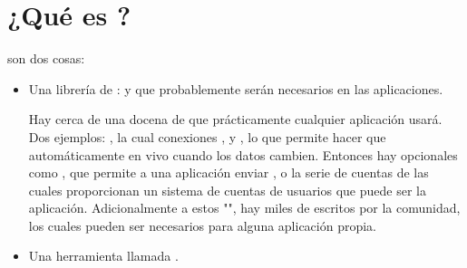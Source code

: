 \section{¿Qué es \meteor?}

\meteor son dos cosas:
\begin{itemize}
	\item  Una librería de \packages: \modules \prewritten y \selfcontained que probablemente serán necesarios en las aplicaciones.

Hay cerca de una docena de \packages \coreAS \meteor que prácticamente cualquier aplicación usará.  Dos ejemplos: \webapp, la cual \handle conexiones \incomming \httpNAME, y \templating, lo que permite hacer \templates \htmlNAME que automáticamente \update en vivo cuando los datos cambien. Entonces hay \packages opcionales como \email, que permite a una aplicación enviar \emails, o la serie de cuentas de \meteor las cuales proporcionan un sistema de cuentas de usuarios \fullFeatured que puede ser \droprightinto la aplicación. Adicionalmente a estos \packages "\coreAS", hay miles de \packages escritos por la comunidad, los cuales pueden ser necesarios para alguna aplicación propia.

\item Una herramienta \commandLine llamada \commandLinemeteor.


\end{itemize}

